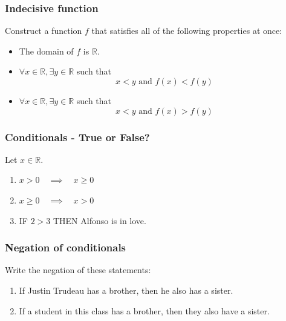 \documentclass[14pt]{beamer}
\begin{document}
\begin{frame}
	\frametitle{Indecisive function}

	Construct a function $f$ that satisfies all of the following properties at
	once:
	\begin{itemize}
		\item The domain of $f$ is $\mathbb{R}$.

		\item $\displaystyle \forall x \in \mathbb{R}, \exists y \in \mathbb{R}$ such
			that
			\[
				x<y \text{ and }f(x) < f(y)
			\]

		\item $\displaystyle \forall x \in \mathbb{R}, \exists y \in \mathbb{R}$ such
			that
			\[
				x<y \text{ and }f(x) > f(y)
			\]
	\end{itemize}
\end{frame}

\begin{frame}
	\frametitle{ Conditionals - True or False?}

	Let $\displaystyle x \in \mathbb{R}$.

	\begin{enumerate}
		\item $\displaystyle x > 0 \quad \implies \quad x \geq 0$

		\item $\displaystyle x \geq 0 \quad \implies \quad x > 0$

			\vfill

		\item IF $\displaystyle 2 > 3$ THEN Alfonso is in love.
	\end{enumerate}

	\vfill
\end{frame}

\begin{frame}
	\frametitle{Negation of conditionals}

	Write the negation of these statements:
	\begin{enumerate}
		\item If Justin Trudeau has a brother, then he also has a sister.

		\item If a student in this class has a brother, then they also have a sister.
	\end{enumerate}
\end{frame}
\end{document}
